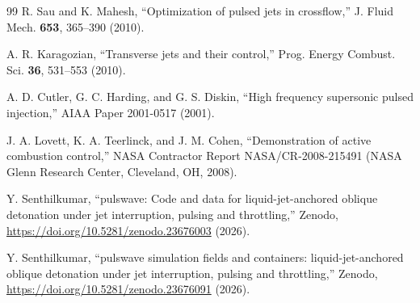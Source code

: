 \documentclass[aip,pof,preprint,amsmath,amssymb]{revtex4-2}
\begin{document}
\begin{thebibliography}{99}
 R. Sau and K. Mahesh, ``Optimization of pulsed jets in crossflow,'' J. Fluid Mech. \textbf{653}, 365--390 (2010).

 A. R. Karagozian, ``Transverse jets and their control,'' Prog. Energy Combust. Sci. \textbf{36}, 531--553 (2010).

 A. D. Cutler, G. C. Harding, and G. S. Diskin, ``High frequency supersonic pulsed injection,'' AIAA Paper 2001-0517 (2001).

 J. A. Lovett, K. A. Teerlinck, and J. M. Cohen, ``Demonstration of active combustion control,'' NASA Contractor Report NASA/CR-2008-215491 (NASA Glenn Research Center, Cleveland, OH, 2008).

 Y. Senthilkumar, ``pulswave: Code and data for liquid-jet-anchored oblique detonation under jet interruption, pulsing and throttling,'' Zenodo, \url{https://doi.org/10.5281/zenodo.23676003} (2026).

 Y. Senthilkumar, ``pulswave simulation fields and containers: liquid-jet-anchored oblique detonation under jet interruption, pulsing and throttling,'' Zenodo, \url{https://doi.org/10.5281/zenodo.23676091} (2026).

\end{thebibliography}
\end{document}
